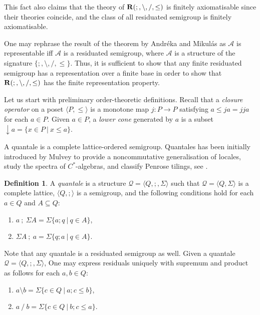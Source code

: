 \documentclass[a4paper]{article}
\theoremstyle{definition}
\newtheorem{definition}{Definition}
\theoremstyle{theorem}
\theoremstyle{proposition}
\theoremstyle{lemma}
\theoremstyle{ex}
\theoremstyle{corollary}
\theoremstyle{claim}
\begin{document}
This fact also claims that the theory of ${\bf R}(;, \setminus, /, \leq)$ is finitely axiomatisable since their theories coincide, and the class of all residuated semigroup is finitely axiomatisable.

One may rephrase the result of the theorem by Andr\'{e}ka and Mikul\'{a}s as $\mathcal{A}$ is representable iff $\mathcal{A}$ is a residuated semigroup, where $\mathcal{A}$ is a structure of the signature $\{ ;, \setminus, /, \leq \}$. Thus, it is sufficient to show that any finite residuated semigroup has a representation over a finite base in order to show that ${\bf R}(;, \setminus, /, \leq)$ has the finite representation property.

Let us start with preliminary order-theoretic definitions. Recall that a \emph{closure operator} on a poset $\langle P, \leq \rangle$ is a monotone map $j : P \to P$ satisfying $a \leq j a = j j a$ for each $a \in P$. Given $a \in P$, a \emph{lower cone} generated by $a$ is a subset $\downarrow a = \{ x \in P \: | \: x \leq a \}$.

A quantale is a complete lattice-ordered semigroup. Quantales has been initially introduced by Mulvey to provide a noncommutative generalisation of locales, study the spectra of $C^{*}$-algebras, and classify Penrose tilings, see \cite{mulvey1986suppl} \cite{mulvey2005noncommutative}.

\begin{definition}
  A \emph{quantale} is a structure $\mathcal{Q} = \langle Q, ;, \Sigma \rangle$ such that $\mathcal{Q} = \langle Q, \Sigma \rangle$ is a complete lattice, $\langle Q, ; \rangle$ is a semigroup, and the following conditions hold for each $a \in Q$ and $A \subseteq Q$:
  \begin{enumerate}
    \item $a \: ; \: \Sigma A = \Sigma \{ a ; q \: | \: q \in A \}$,
    \item $\Sigma A \: ; \: a = \Sigma \{ q ; a \: | \: q \in A \}$.
  \end{enumerate}
\end{definition}

Note that any quantale is a residuated semigroup as well. Given a quantale $\mathcal{Q} = \langle Q, ;, \Sigma \rangle$, One may express residuals uniquely with supremum and product as follows for each $a, b \in Q$:
\begin{enumerate}
  \item $a \setminus b = \Sigma \{ c \in Q \: | \: a ; c \leq b \}$,
  \item $a \: / \: b = \Sigma \{ c \in Q\: | \: b ; c \leq a \}$.
\end{enumerate}
\end{document}
